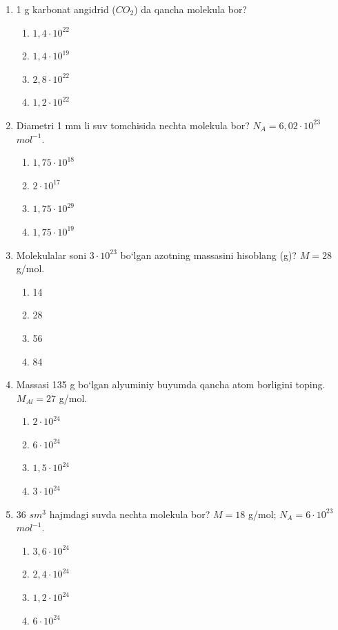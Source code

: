 \begin{enumerate}
\item 1 g karbonat angidrid ($CO_2$) da qancha molekula bor?
\begin{enumerate}[label=\Alph*)]
\item $1,4 \cdot 10^{22}$
\item $1,4 \cdot 10^{19}$
\item $2,8 \cdot 10^{22}$
\item $1,2 \cdot 10^{22}$
\end{enumerate}

\item Diametri 1 mm li suv tomchisida nechta molekula bor? $N_A = 6,02 \cdot 10^{23}$ $mol^{-1}$.
\begin{enumerate}[label=\Alph*)]
\item $1,75 \cdot 10^{18}$
\item $2 \cdot 10^{17}$
\item $1,75 \cdot 10^{29}$
\item $1,75 \cdot 10^{19}$
\end{enumerate}

\item Molekulalar soni $3 \cdot 10^{23}$ bo‘lgan azotning massasini hisoblang (g)? $M = 28$ g/mol.
\begin{enumerate}[label=\Alph*)]
\item 14
\item 28
\item 56
\item 84
\end{enumerate}

\item Massasi 135 g bo‘lgan alyuminiy buyumda qancha atom borligini toping. $M_{Al} = 27$ g/mol.
\begin{enumerate}[label=\Alph*)]
\item $2 \cdot 10^{24}$
\item $6 \cdot 10^{24}$
\item $1,5 \cdot 10^{24}$
\item $3 \cdot 10^{24}$
\end{enumerate}

\item 36 $sm^3$ hajmdagi suvda nechta molekula bor? $M = 18$ g/mol; $N_A = 6 \cdot 10^{23}$ $mol^{-1}$.
\begin{enumerate}[label=\Alph*)]
\item $3,6 \cdot 10^{24}$
\item $2,4 \cdot 10^{24}$
\item $1,2 \cdot 10^{24}$
\item $6 \cdot 10^{24}$
\end{enumerate}


\end{enumerate}
